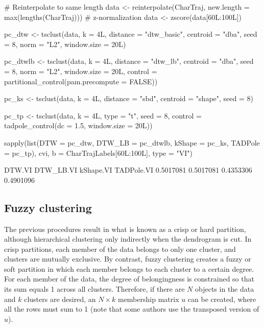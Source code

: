 \begin{example}
# Reinterpolate to same length
data <- reinterpolate(CharTraj, new.length = max(lengths(CharTraj)))
# z-normalization
data <- zscore(data[60L:100L])

pc_dtw <- tsclust(data, k = 4L,
                  distance = "dtw_basic", centroid = "dba",
                  seed = 8,
                  norm = "L2", window.size = 20L)

pc_dtwlb <- tsclust(data, k = 4L,
                    distance = "dtw_lb", centroid = "dba",
                    seed = 8,
                    norm = "L2", window.size = 20L,
                    control = partitional_control(pam.precompute = FALSE))

pc_ks <- tsclust(data, k = 4L,
                 distance = "sbd", centroid = "shape",
                 seed = 8)

pc_tp <- tsclust(data, k = 4L, type = "t",
                 seed = 8,
                 control = tadpole_control(dc = 1.5,
                                           window.size = 20L))

sapply(list(DTW = pc_dtw, DTW_LB = pc_dtwlb, kShape = pc_ks, TADPole = pc_tp),
       cvi, b = CharTrajLabels[60L:100L], type = "VI")

   DTW.VI  DTW_LB.VI  kShape.VI TADPole.VI
0.5017081  0.5017081  0.4353306  0.4901096
\end{example}

\subsection{Fuzzy clustering}
\label{sec:fuzzy}

The previous procedures result in what is known as a crisp or hard partition,
although hierarchical clustering only indirectly when the dendrogram is cut.
In crisp partitions,
each member of the data belongs to only one cluster,
and clusters are mutually exclusive.
By contrast,
fuzzy clustering creates a fuzzy or soft partition in which each member belongs to each cluster to a certain degree.
For each member of the data, the degree of belongingness is constrained so that its sum equals 1 across all clusters.
Therefore, if there are $N$ objects in the data and $k$ clusters are desired,
an $N \times k$ membership matrix $u$ can be created,
where all the rows must sum to 1
(note that some authors use the transposed version of $u$).

